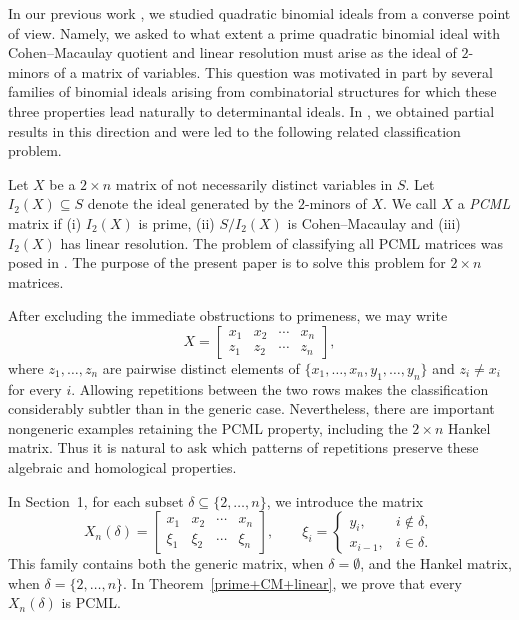 \documentclass[12pt]{amsart}
\begin{document}
In our previous work \cite{HQS}, we studied quadratic binomial ideals
from a converse point of view. Namely, we asked to what extent a prime
quadratic binomial ideal with Cohen--Macaulay quotient and linear
resolution must arise as the ideal of $2$-minors of a matrix of
variables. This question was motivated in part by several families of
binomial ideals arising from combinatorial structures for which these
three properties lead naturally to determinantal ideals. In
\cite{HQS}, we obtained partial results in this direction and were led
to the following related classification problem.

Let $X$ be a $2\times n$ matrix of not necessarily distinct variables in $S$. Let $I_2(X)\subseteq S$ denote the ideal generated by the $2$-minors of
$X$. We call $X$ a {\em PCML} matrix if (i) $I_2(X)$ is prime, (ii) $S/I_2(X)$ is Cohen--Macaulay and (iii) $I_2(X)$ has linear resolution. The problem of classifying all PCML matrices was posed in \cite{HQS}.
The purpose of the present paper is to solve this problem for
$2\times n$ matrices.

After excluding the immediate obstructions to primeness, we may write
\[
X=
\begin{bmatrix}
x_1 & x_2 & \cdots & x_n\\
z_1 & z_2 & \cdots & z_n
\end{bmatrix},
\]
where $z_1,\ldots,z_n$ are pairwise distinct elements of
$\{x_1,\ldots,x_n,y_1,\ldots,y_n\}$ and $z_i\neq x_i$ for every $i$.
Allowing repetitions between the two rows makes the classification
considerably subtler than in the generic case. Nevertheless, there are
important nongeneric examples retaining the PCML property, including
the $2\times n$ Hankel matrix. Thus it is natural to ask which patterns
of repetitions preserve these algebraic and homological properties.

In Section~1, for each subset
$\delta\subseteq\{2,\ldots,n\}$, we introduce the matrix
\[
X_n(\delta)=
\begin{bmatrix}
x_1 & x_2 & \cdots & x_n\\
\xi_1 & \xi_2 & \cdots & \xi_n
\end{bmatrix},
\qquad
\xi_i=
\begin{cases}
y_i, & i\notin\delta,\\
x_{i-1}, & i\in\delta.
\end{cases}
\]
This family contains both the generic matrix, when $\delta=\emptyset$,
and the Hankel matrix, when $\delta=\{2,\ldots,n\}$. In
Theorem~\ref{prime+CM+linear}, we prove that every $X_n(\delta)$ is PCML.
\end{document}
